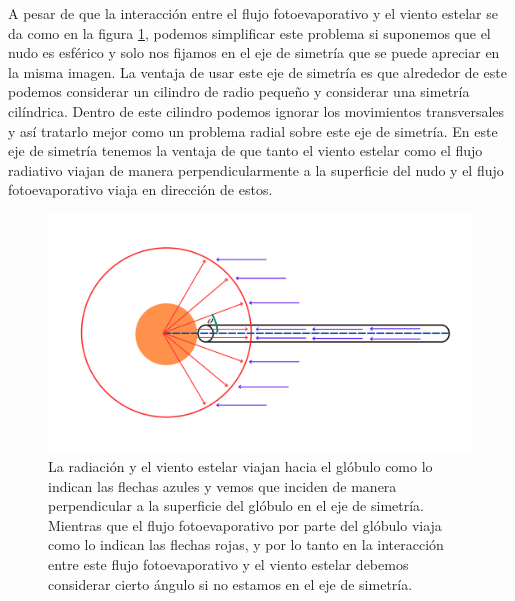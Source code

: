 \documentclass{book}
\begin{document}
A pesar de que la interacción entre el flujo fotoevaporativo y el viento estelar se da como en la figura \ref{fig:cilindross}, podemos simplificar este problema si suponemos que el nudo es esférico y solo nos fijamos en el eje de simetría que se puede apreciar en la misma imagen. La ventaja de usar este eje de simetría es que alrededor de este podemos considerar un cilindro de radio pequeño y considerar una simetría cilíndrica. Dentro de este cilindro podemos ignorar los movimientos transversales y así tratarlo mejor como un problema radial sobre este eje de simetría. En este eje de simetría tenemos la ventaja de que tanto el viento estelar como el flujo radiativo viajan de manera perpendicularmente a la superficie del nudo y el flujo fotoevaporativo viaja en dirección de estos. 

\begin{figure}[h]
    \centering    \includegraphics[width=\textwidth]{artesanales/ImgFi01-2.pdf}
    \caption{La radiación y el viento estelar viajan hacia el glóbulo como lo indican las flechas azules y vemos que inciden de manera perpendicular a la superficie del glóbulo en el eje de simetría. Mientras que el flujo fotoevaporativo por parte del glóbulo viaja como lo indican las flechas rojas, y por lo tanto en la interacción entre este flujo fotoevaporativo y el viento estelar debemos considerar cierto ángulo si no estamos en el eje de simetría.}
    \label{fig:cilindross}
\end{figure}

\end{document}
